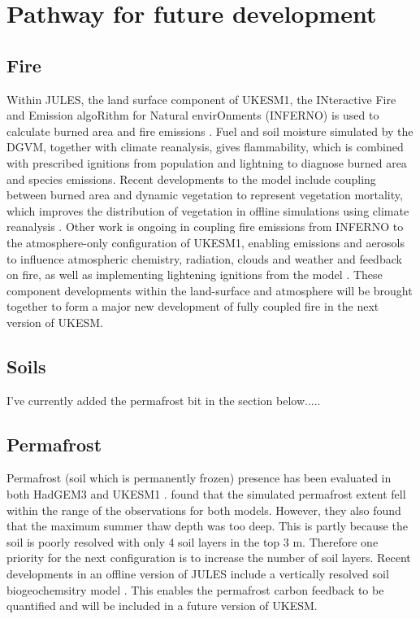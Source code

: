 \section{Pathway for future development}

\subsection{Fire}
Within JULES, the land surface component of UKESM1, the INteractive Fire and Emission algoRithm for Natural envirOnments (INFERNO) is used to calculate burned area and fire emissions \citep{Mangeon2016}. Fuel and soil moisture simulated by the DGVM, together with climate reanalysis, gives flammability, which is combined with prescribed ignitions from population and lightning to diagnose burned area and species emissions. Recent developments to the model include coupling between burned area and dynamic vegetation to represent vegetation mortality, which improves the distribution of vegetation in offline simulations using climate reanalysis \citep{Burton2019}. Other work is ongoing in coupling fire emissions from INFERNO to the atmosphere-only configuration of UKESM1, enabling emissions and aerosols to influence atmospheric chemistry, radiation, clouds and weather and feedback on fire, as well as implementing lightening ignitions from the model \citep{Joao2020}. These component developments within the land-surface and atmosphere will be brought together to form a major new development of fully coupled fire in the next version of UKESM. 

\subsection{Soils}
  I've currently added the permafrost bit in the section below.....

\subsection{Permafrost}
Permafrost (soil which is permanently frozen) presence has been evaluated in both HadGEM3 and UKESM1 \citep{Sellar2019-bo,burke2020evaluating}. \cite{burke2020evaluating} found that the simulated permafrost extent fell within the range of the observations for both models. However, they also found that the maximum summer thaw depth was too deep. This is partly because the soil is poorly resolved with only 4 soil layers in the top 3 m. Therefore one priority for the next configuration is to increase the number of soil layers. Recent developments in an offline version of JULES include a vertically resolved soil biogeochemsitry model \citep{wiltshire2020jules,burke2017vertical}. This enables the permafrost carbon feedback to be quantified \citep{burke2017quantifying} and will be included in a future version of UKESM.

